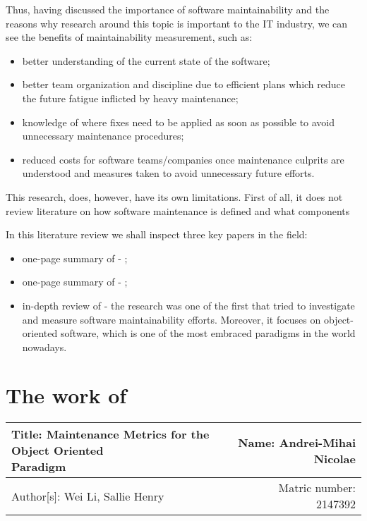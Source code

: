 \documentclass[a4paper,12pt]{article}
\begin{document}
  Thus, having discussed the importance of software maintainability and the
  reasons why research around this topic is important to the IT industry,
  we can see the benefits of maintainability measurement, such as:
    \begin{itemize}
      \item better understanding of the current state of the software;
      \item better team organization and discipline due to efficient plans 
      which reduce the future fatigue inflicted by heavy maintenance;
      \item knowledge of where fixes need to be applied as soon as possible
      to avoid unnecessary maintenance procedures;
      \item reduced costs for software teams/companies once maintenance 
      culprits are understood and measures taken to avoid unnecessary future
      efforts.
    \end{itemize}

  This research, does, however, have its own limitations. First of all, it does
  not review literature on how software maintenance is defined and what 
  components 
  
  In this literature review we shall inspect three key papers in the field:
    \begin{itemize}
      \item one-page summary of \citet{oman1992metrics} - ;
      \item one-page summary of \citet{pfleeger1990framework} - ;
      \item in-depth review of \citet{li1993maintenance} - the research was one of the
        first that tried to investigate and measure software maintainability efforts. 
        Moreover, it focuses on object-oriented software, which is one of the most
        embraced paradigms in the world nowadays.
    \end{itemize}

\section{The work of \cite{li1993maintenance}}

 \begin{center}
   \begin{tabular}{ | l | r | }
    \hline
    \parbox[t]{5cm}{Title: Maintenance Metrics for the Object Oriented
                    \\ Paradigm} 
     & Name: Andrei-Mihai Nicolae \\ 
     \hline
     Author[s]: Wei Li, Sallie Henry & Matric number: 2147392 \\
    \hline
   \end{tabular}
 \end{center}
\end{document}
